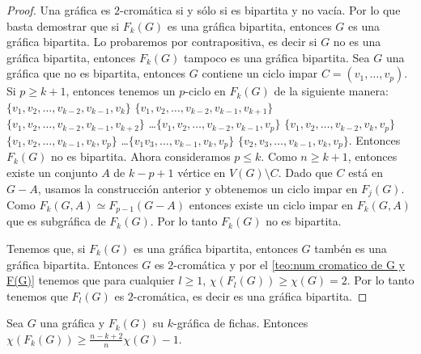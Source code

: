 \begin{proof}
    Una gr\'afica es $2$-crom\'atica si y s\'olo si es bipartita y no
    vac\'ia. Por lo que basta demostrar que si $F_k(G)$ es una gr\'afica
    bipartita, entonces $G$ es una gr\'afica bipartita. Lo probaremos por
    contrapositiva, es decir si $G$ no es una gr\'afica bipartita, entonces
    $F_k(G)$ tampoco es una gr\'afica bipartita. Sea $G$ una gr\'afica que
    no es bipartita, entonces $G$ contiene un ciclo impar $C=(v_1, \dots,
    v_p)$. Si $p \geq k+1$, entonces tenemos un $p$-ciclo en $F_k(G)$ de la
    siguiente manera: $\{v_1, v_2, \dots, v_{k-2}, v_{k-1}, v_k\}$ $\{v_1,
    v_2, \dots, v_{k-2}, v_{k-1}, v_{k+1}\}$ $\{v_1, v_2, \dots, v_{k-2},
    v_{k-1}, v_{k+2}\}$ \dots $\{v_1, v_2, \dots, v_{k-2}, v_{k-1}, v_p\}$
    $\{v_1, v_2, \dots, v_{k-2}, v_k, v_p\}$ $\{v_1, v_2, \dots, v_{k-1},
    v_k, v_p\}$ \dots $\{v_1 v_3, \dots, v_{k-1}, v_k, v_p\}$ $\{v_2, v_3,
    \dots, v_{k-1}, v_k, v_p\}$. Entonces $F_k(G)$ no es bipartita. Ahora
    consideramos $p \leq k$. Como $n \geq k+1$, entonces existe un conjunto
    $A$ de $k-p+1$ v\'ertice en $V(G)\setminus C$. Dado que $C$ est\'a en $G
    -A$, usamos la construcci\'on anterior y obtenemos un ciclo impar en
    $F_j(G)$. Como $F_k(G,A) \simeq F_{p-1}(G-A)$ entonces existe un ciclo
    impar en $F_k(G,A)$ que es subgr\'afica de $F_k(G)$. Por lo tanto
    $F_k(G)$ no es bipartita.

    Tenemos que, si $F_k(G)$ es una gr\'afica bipartita, entonces $G$
    tamb\'en es una gr\'afica bipartita. Entonces $G$ es $2$-crom\'atica y
    por el \cref{teo:num cromatico de G y F(G)} tenemos que para cualquier $l\geq 1$, $\chi
    (F_l(G)) \geq \chi (G)=2$. Por lo tanto tenemos que $F_l(G)$ es
    $2$-crom\'atica, es decir es una gr\'afica bipartita.
\end{proof}

\begin{teorema}
    \label{relacion num cromatico G y F(G) con k}
        Sea $G$ una gr\'afica y $F_k(G)$ su $k$-gr\'afica de fichas. Entonces
        $\chi(F_k(G)) \geq \frac{n-k+2}{n} \chi(G) -1$.
    \end{teorema}
    
    
    
